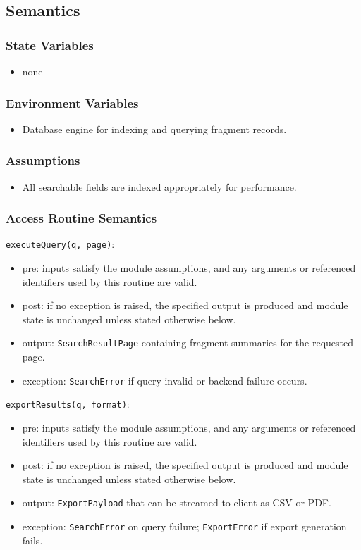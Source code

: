 \documentclass[12pt, titlepage]{article}
\begin{document}
\subsection{Semantics}

\subsubsection{State Variables}
\begin{itemize}
    \item none
\end{itemize}

\subsubsection{Environment Variables}
\begin{itemize}
    \item Database engine for indexing and querying fragment records.
\end{itemize}

\subsubsection{Assumptions}
\begin{itemize}
    \item All searchable fields are indexed appropriately for performance.
\end{itemize}

\subsubsection{Access Routine Semantics}

\noindent \texttt{executeQuery(q, page)}:
\begin{itemize}
    \item pre: inputs satisfy the module assumptions, and any arguments or referenced identifiers used by this routine are valid.
    \item post: if no exception is raised, the specified output is produced and module state is unchanged unless stated otherwise below.
    \item output: \texttt{SearchResultPage} containing fragment summaries for the requested page.
    \item exception: \texttt{SearchError} if query invalid or backend failure occurs.
\end{itemize}

\noindent \texttt{exportResults(q, format)}:
\begin{itemize}
    \item pre: inputs satisfy the module assumptions, and any arguments or referenced identifiers used by this routine are valid.
    \item post: if no exception is raised, the specified output is produced and module state is unchanged unless stated otherwise below.
    \item output: \texttt{ExportPayload} that can be streamed to client as CSV or PDF.
    \item exception: \texttt{SearchError} on query failure; \texttt{ExportError} if export generation fails.
\end{itemize}
\end{document}
